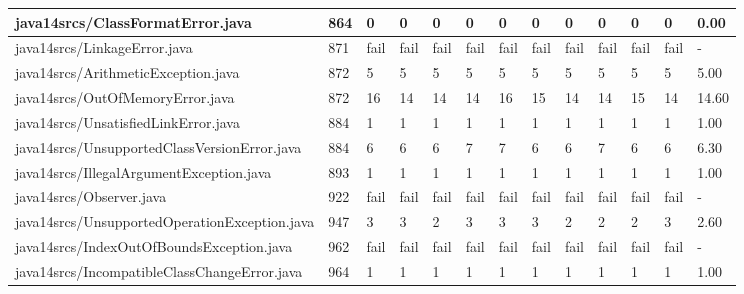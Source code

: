 \begin{tabular}{|l|l|l|l|l|l|l|l|l|l|l|l|l|}
\hline
java14srcs/ClassFormatError.java                   & 864         & 0         & 0         & 0         & 0         & 0         & 0         & 0         & 0         & 0         & 0         & 0.00      \\
\hline
java14srcs/LinkageError.java                       & 871         & fail      & fail      & fail      & fail      & fail      & fail      & fail      & fail      & fail      & fail      & -         \\
\hline
java14srcs/ArithmeticException.java                & 872         & 5         & 5         & 5         & 5         & 5         & 5         & 5         & 5         & 5         & 5         & 5.00      \\
\hline
java14srcs/OutOfMemoryError.java                   & 872         & 16        & 14        & 14        & 14        & 16        & 15        & 14        & 14        & 15        & 14        & 14.60     \\
\hline
java14srcs/UnsatisfiedLinkError.java               & 884         & 1         & 1         & 1         & 1         & 1         & 1         & 1         & 1         & 1         & 1         & 1.00      \\
\hline
java14srcs/UnsupportedClassVersionError.java       & 884         & 6         & 6         & 6         & 7         & 7         & 6         & 6         & 7         & 6         & 6         & 6.30      \\
\hline
java14srcs/IllegalArgumentException.java           & 893         & 1         & 1         & 1         & 1         & 1         & 1         & 1         & 1         & 1         & 1         & 1.00      \\
\hline
java14srcs/Observer.java                           & 922         & fail      & fail      & fail      & fail      & fail      & fail      & fail      & fail      & fail      & fail      & -         \\
\hline
java14srcs/UnsupportedOperationException.java      & 947         & 3         & 3         & 2         & 3         & 3         & 3         & 2         & 2         & 2         & 3         & 2.60      \\
\hline
java14srcs/IndexOutOfBoundsException.java          & 962         & fail      & fail      & fail      & fail      & fail      & fail      & fail      & fail      & fail      & fail      & -         \\
\hline
java14srcs/IncompatibleClassChangeError.java       & 964         & 1         & 1         & 1         & 1         & 1         & 1         & 1         & 1         & 1         & 1         & 1.00      \\

\end{tabular}
